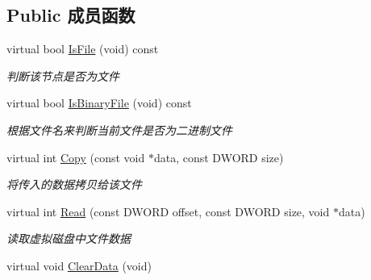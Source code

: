 \subsection*{Public 成员函数}
\begin{DoxyCompactItemize}
\item 
\hypertarget{class_file_sys_1_1_file_node_a8a9c01da1c043554743877aff68ddad9}{virtual bool \hyperlink{class_file_sys_1_1_file_node_a8a9c01da1c043554743877aff68ddad9}{Is\-File} (void) const }\label{class_file_sys_1_1_file_node_a8a9c01da1c043554743877aff68ddad9}

\begin{DoxyCompactList}\small\item\em 判断该节点是否为文件 \end{DoxyCompactList}\item 
virtual bool \hyperlink{class_file_sys_1_1_file_node_a0bf53af4d6c34922bc1c667415b65d5c}{Is\-Binary\-File} (void) const 
\begin{DoxyCompactList}\small\item\em 根据文件名来判断当前文件是否为二进制文件 \end{DoxyCompactList}\item 
virtual int \hyperlink{class_file_sys_1_1_file_node_a4284926acb04ef0ab0db8b73d2f1fba1}{Copy} (const void $\ast$data, const D\-W\-O\-R\-D size)
\begin{DoxyCompactList}\small\item\em 将传入的数据拷贝给该文件 \end{DoxyCompactList}\item 
virtual int \hyperlink{class_file_sys_1_1_file_node_a63de509985ada5a7cedfc46c1e4e1277}{Read} (const D\-W\-O\-R\-D offset, const D\-W\-O\-R\-D size, void $\ast$data)
\begin{DoxyCompactList}\small\item\em 读取虚拟磁盘中文件数据 \end{DoxyCompactList}\item 
\hypertarget{class_file_sys_1_1_file_node_ab19cd336df69c6d8cdededa53486d63a}{virtual void \hyperlink{class_file_sys_1_1_file_node_ab19cd336df69c6d8cdededa53486d63a}{Clear\-Data} (void)}\label{class_file_sys_1_1_file_node_ab19cd336df69c6d8cdededa53486d63a}


\end{DoxyCompactItemize}
